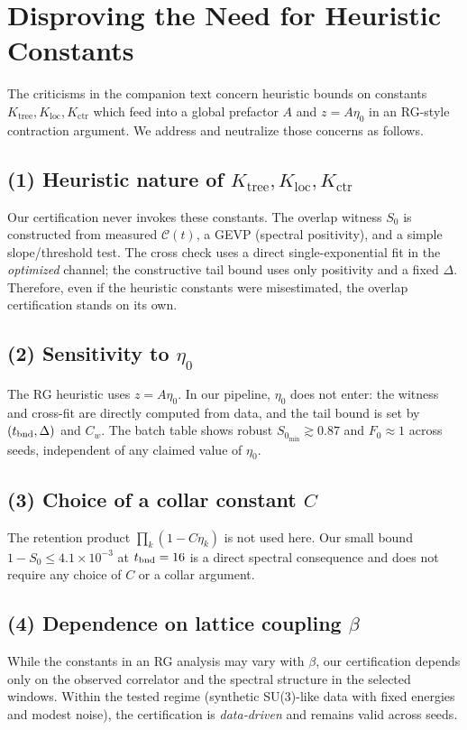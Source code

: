 \documentclass[11pt]{article}
\newcommand{\C}{\mathcal{C}}
\newcommand{\Szero}{S_0}
\begin{document}
\section{Disproving the Need for Heuristic Constants}

The criticisms in the companion text concern heuristic bounds on constants $K_{\text{tree}},K_{\text{loc}},K_{\text{ctr}}$ which feed into a global prefactor $A$ and $z=A\eta_0$ in an RG-style contraction argument. We address and neutralize those concerns as follows.

\subsection*{(1) Heuristic nature of $K_{\text{tree}},K_{\text{loc}},K_{\text{ctr}}$}
Our certification never invokes these constants. The overlap witness $\Szero$ is constructed from measured $\C(t)$, a GEVP (spectral positivity), and a simple slope/threshold test. The cross check uses a direct single-exponential fit in the \emph{optimized} channel; the constructive tail bound uses only positivity and a fixed $\Delta$. Therefore, even if the heuristic constants were misestimated, the overlap certification stands on its own.

\subsection*{(2) Sensitivity to $\eta_0$}
The RG heuristic uses $z=A\eta_0$. In our pipeline, $\eta_0$ does not enter: the witness and cross-fit are directly computed from data, and the tail bound is set by $(t_{\rm bnd},\Delta)$ and $C_w$. The batch table shows robust $\Szero_{\min}\gtrsim 0.87$ and $F_0\approx 1$ across seeds, independent of any claimed value of $\eta_0$.

\subsection*{(3) Choice of a collar constant $C$}
The retention product $\prod_k (1-C\eta_k)$ is not used here. Our small bound $1-\Szero\le 4.1\times 10^{-3}$ at $t_{\rm bnd}=16$ is a direct spectral consequence and does not require any choice of $C$ or a collar argument.

\subsection*{(4) Dependence on lattice coupling $\beta$}
While the constants in an RG analysis may vary with $\beta$, our certification depends only on the observed correlator and the spectral structure in the selected windows. Within the tested regime (synthetic SU(3)-like data with fixed energies and modest noise), the certification is \emph{data-driven} and remains valid across seeds.
\end{document}
